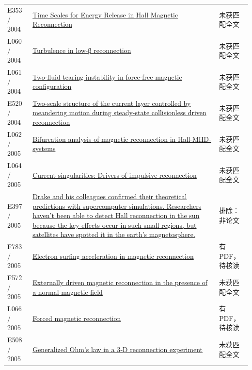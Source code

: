 \begin{longtable}{P{24mm}P{97mm}P{27mm}}
E353 / 2004 & \href{https://ui.adsabs.harvard.edu/abs/2004AGUSMSM43A..04H/abstract}{Time Scales for Energy Release in Hall Magnetic Reconnection} & 未获匹配全文\\

L060 / 2004 & \href{https://doi.org/10.1063/1.1776565}{Turbulence in low-β reconnection} & 未获匹配全文\\

L061 / 2004 & \href{https://doi.org/10.1063/1.1773778}{Two-fluid tearing instability in force-free magnetic configuration} & 未获匹配全文\\

E520 / 2004 & \href{https://doi.org/10.1063/1.1758718}{Two-scale structure of the current layer controlled by meandering motion during steady-state collisionless driven reconnection} & 未获匹配全文\\

L062 / 2005 & \href{https://doi.org/10.1016/j.physd.2005.06.003}{Bifurcation analysis of magnetic reconnection in Hall-MHD-systems} & 未获匹配全文\\

L064 / 2005 & \href{https://doi.org/10.1063/1.1872893}{Current singularities: Drivers of impulsive reconnection} & 未获匹配全文\\

E397 / 2005 & \href{https://terpconnect.umd.edu/~drake/news/TriggeringSolarMayhem.pdf}{Drake and his colleagues confirmed their theoretical predictions with supercomputer simulations. Researchers haven't been able to detect Hall reconnection in the sun because the key effects occur in such small regions,  but satellites have spotted it in the earth's magnetosphere.} & 排除：非论文\\

F783 / 2005 & \href{https://doi.org/10.1029/2005ja011229}{Electron surfing acceleration in magnetic reconnection} & 有PDF，待核读\\

F572 / 2005 & \href{https://doi.org/10.1029/2004ja010948}{Externally driven magnetic reconnection in the presence of a normal magnetic field} & 未获匹配全文\\

L066 / 2005 & \href{https://doi.org/10.1029/2004gl022058}{Forced magnetic reconnection} & 有PDF，待核读\\

E508 / 2005 & \href{https://doi.org/10.1029/2004gl021245}{Generalized Ohm's law in a 3‐D reconnection experiment} & 未获匹配全文\\


\end{longtable}
